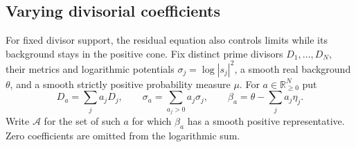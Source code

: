 \subsection{Varying divisorial coefficients}

For fixed divisor support, the residual equation also controls limits while its background stays in the positive cone. Fix distinct prime divisors $D_1,\ldots,D_N$, their metrics and logarithmic potentials $\sigma_j=\log|s_j|^2$, a smooth real background $\theta$, and a smooth strictly positive probability measure $\mu$. For $a\in\mathbb R_{\geq0}^N$ put
\[
 D_a=\sum_j a_jD_j,\qquad
 \sigma_a=\sum_{a_j>0}a_j\sigma_j,\qquad
 \beta_a=\theta-\sum_j a_j\eta_j.
\]
Write $\mathcal A$ for the set of such $a$ for which $\beta_a$ has a smooth positive representative. Zero coefficients are omitted from the logarithmic sum.

